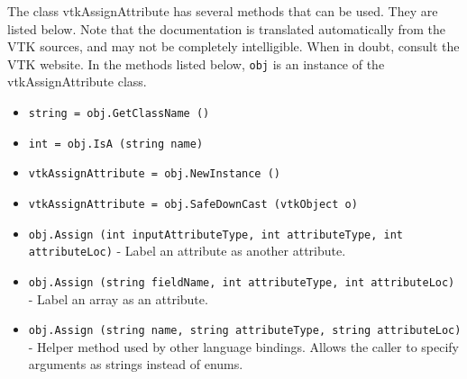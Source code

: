 The class vtkAssignAttribute has several methods that can be used.
  They are listed below.
Note that the documentation is translated automatically from the VTK sources,
and may not be completely intelligible.  When in doubt, consult the VTK website.
In the methods listed below, \verb|obj| is an instance of the vtkAssignAttribute class.
\begin{itemize}
\item  \verb|string = obj.GetClassName ()|

\item  \verb|int = obj.IsA (string name)|

\item  \verb|vtkAssignAttribute = obj.NewInstance ()|

\item  \verb|vtkAssignAttribute = obj.SafeDownCast (vtkObject o)|

\item  \verb|obj.Assign (int inputAttributeType, int attributeType, int attributeLoc)| -  Label an attribute as another attribute.

\item  \verb|obj.Assign (string fieldName, int attributeType, int attributeLoc)| -  Label an array as an attribute.

\item  \verb|obj.Assign (string name, string attributeType, string attributeLoc)| -  Helper method used by other language bindings. Allows the caller to
 specify arguments as strings instead of enums.

\end{itemize}

